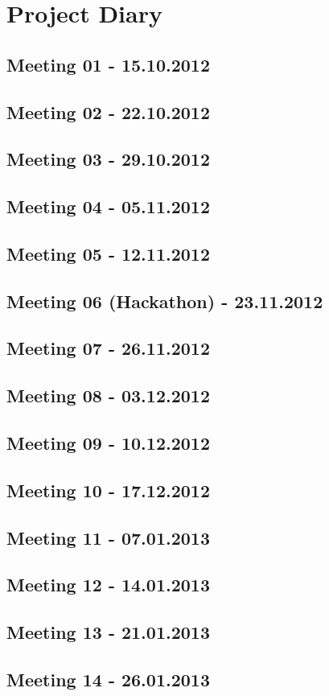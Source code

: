 \chapter{Project Diary}
\section{Meeting 01 - 15.10.2012}
\blindtext

\section{Meeting 02 - 22.10.2012}
\blindtext

\section{Meeting 03 - 29.10.2012}
\blindtext

\section{Meeting 04 - 05.11.2012}
\blindtext

\section{Meeting 05 - 12.11.2012}
\blindtext

\section{Meeting 06 (Hackathon) - 23.11.2012}
\blindtext

\section{Meeting 07 - 26.11.2012}
\blindtext

\section{Meeting 08 - 03.12.2012}
\blindtext

\section{Meeting 09 - 10.12.2012}
\blindtext

\section{Meeting 10 - 17.12.2012}
\blindtext

\section{Meeting 11 - 07.01.2013}
\blindtext

\section{Meeting 12 - 14.01.2013}
\blindtext

\section{Meeting 13 - 21.01.2013}
\blindtext

\section{Meeting 14 - 26.01.2013}
\blindtext